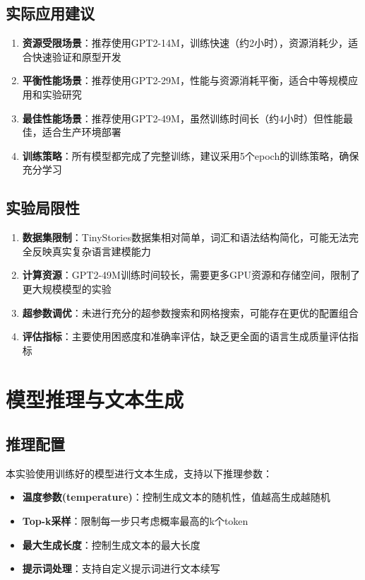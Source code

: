\documentclass{article}
\begin{document}
\subsection{实际应用建议}
\begin{enumerate}
    \item \textbf{资源受限场景}：推荐使用GPT2-14M，训练快速（约2小时），资源消耗少，适合快速验证和原型开发
    \item \textbf{平衡性能场景}：推荐使用GPT2-29M，性能与资源消耗平衡，适合中等规模应用和实验研究
    \item \textbf{最佳性能场景}：推荐使用GPT2-49M，虽然训练时间长（约4小时）但性能最佳，适合生产环境部署
    \item \textbf{训练策略}：所有模型都完成了完整训练，建议采用5个epoch的训练策略，确保充分学习
\end{enumerate}

\subsection{实验局限性}
\begin{enumerate}
    \item \textbf{数据集限制}：TinyStories数据集相对简单，词汇和语法结构简化，可能无法完全反映真实复杂语言建模能力
    \item \textbf{计算资源}：GPT2-49M训练时间较长，需要更多GPU资源和存储空间，限制了更大规模模型的实验
    \item \textbf{超参数调优}：未进行充分的超参数搜索和网格搜索，可能存在更优的配置组合
    \item \textbf{评估指标}：主要使用困惑度和准确率评估，缺乏更全面的语言生成质量评估指标
\end{enumerate}

\section{模型推理与文本生成}

\subsection{推理配置}
本实验使用训练好的模型进行文本生成，支持以下推理参数：

\begin{itemize}
    \item \textbf{温度参数(temperature)}：控制生成文本的随机性，值越高生成越随机
    \item \textbf{Top-k采样}：限制每一步只考虑概率最高的k个token
    \item \textbf{最大生成长度}：控制生成文本的最大长度
    \item \textbf{提示词处理}：支持自定义提示词进行文本续写
\end{itemize}
\end{document}
